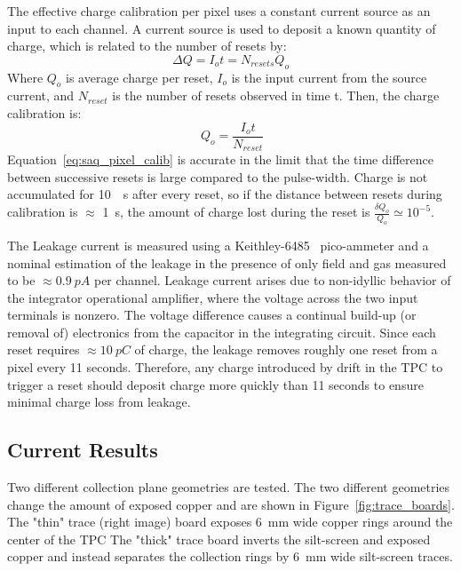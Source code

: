 The effective charge calibration per pixel uses a constant current source as an input to each channel.
A current source is used to deposit a known quantity of charge, which is related to the number of resets by:
\begin{equation}
 \Delta Q = I_{o}t = N_{resets}Q_{o}
\end{equation}
Where $Q_{o}$ is average charge per reset, $I_{o}$ is the input current from the source current, and $N_{reset}$ is the number of resets observed in time t.
Then, the charge calibration is:
\begin{equation}~\label{eq:saq_pixel_calib}
 Q_{o} = \frac{I_{o}t}{N_{reset}}
\end{equation}
Equation~\ref{eq:saq_pixel_calib} is accurate in the limit that the time difference between successive resets is large compared to the pulse-width.
Charge is not accumulated for 10~\unit{\mu s} after every reset, so if the distance between resets during calibration is $\approx$ 1~\unit{s}, the amount of charge lost during the reset is $\frac{\delta Q_{o}}{Q_{o}} \simeq 10^{-5}$.

The Leakage current is measured using a Keithley-6485~\citep{picoammeter-6485-datasheet} pico-ammeter and a nominal estimation of the leakage in the presence of only field and gas measured to be $\approx 0.9~\unit{pA}$ per channel.
Leakage current arises due to non-idyllic behavior of the integrator operational amplifier, where the voltage across the two input terminals is nonzero.
The voltage difference causes a continual build-up (or removal of) electronics from the capacitor in the integrating circuit.
Since each reset requires $\approx 10~\unit{pC}$ of charge, the leakage removes roughly one reset from a pixel every 11 seconds.
Therefore, any charge introduced by drift in the TPC to trigger a reset should deposit charge more quickly than 11 seconds to ensure minimal charge loss from leakage.


\subsection{Current Results}

Two different collection plane geometries are tested.
The two different geometries change the amount of exposed copper and are shown in Figure~\ref{fig:trace_boards}.
The "thin" trace (right image) board exposes 6~\unit{mm} wide copper rings around the center of the TPC
The "thick" trace board inverts the silt-screen and exposed copper and instead separates the collection rings by 6~\unit{mm} wide silt-screen traces.

